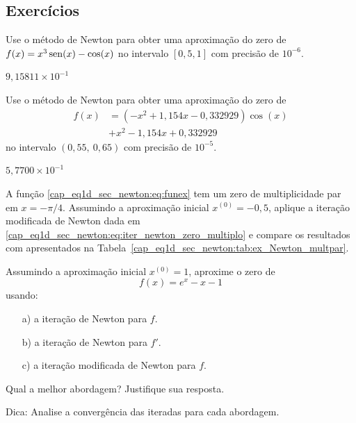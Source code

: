 \subsection*{Exercícios}

\begin{exer}\label{exer:Newton_1}
  Use o método de Newton para obter uma aproximação do zero de $f(x)=x^3\operatorname{sen}(x)-\cos(x)$ no intervalo $[0,5, 1]$ com precisão de $10^{-6}$.
\end{exer}
\begin{resp}
  $9,15811\times 10^{-1}$
\end{resp}

\begin{exer}\label{exer:Newton_multpar}
  Use o método de Newton para obter uma aproximação do zero de
  \begin{equation}
    \begin{aligned}
      f(x) &= (-x^2+1,154x-0,332929)\cos(x) \\
           &+ x^2 - 1,154x + 0,332929
    \end{aligned}
\end{equation}
no intervalo $(0,55, ~0,65)$ com precisão de $10^{-5}$.
\end{exer}
\begin{resp}
  $5,7700\times 10^{-1}$
\end{resp}

\begin{exer}\label{cap_eq1d_sec_newton:exer:iter_newton_zeros_multiplos}
  A função \eqref{cap_eq1d_sec_newton:eq:funex} tem um zero de multiplicidade par em $x=-\pi/4$. Assumindo a aproximação inicial $x^{(0)} = -0,5$, aplique a iteração modificada de Newton dada em \eqref{cap_eq1d_sec_newton:eq:iter_newton_zero_multiplo} e compare os resultados com apresentados na Tabela~\ref{cap_eq1d_sec_newton:tab:ex_Newton_multpar}.
\end{exer}

\begin{exer}
  Assumindo a aproximação inicial $x^{(0)} = 1$, aproxime o zero de
  \begin{equation}
    f(x) = e^x - x - 1
  \end{equation}
  usando:
  \begin{enumerate}[a)]
  \item[a)] a iteração de Newton para $f$.
  \item[b)] a iteração de Newton para $f'$.
  \item[c)] a iteração modificada de Newton para $f$.
  \end{enumerate}
  Qual a melhor abordagem? Justifique sua resposta.
\end{exer}
\begin{resp}
  Dica: Analise a convergência das iteradas para cada abordagem.
\end{resp}

